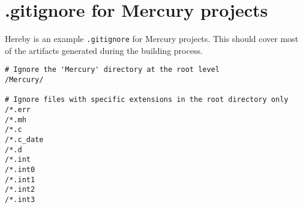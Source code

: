 \chapter{.gitignore for Mercury projects}

Hereby is an example \texttt{.gitignore} for Mercury projects. This should cover most of the artifacts generated during the building process.

\begin{lstlisting}
# Ignore the 'Mercury' directory at the root level
/Mercury/

# Ignore files with specific extensions in the root directory only
/*.err
/*.mh
/*.c
/*.c_date
/*.d
/*.int
/*.int0
/*.int1
/*.int2
/*.int3
\end{lstlisting}


